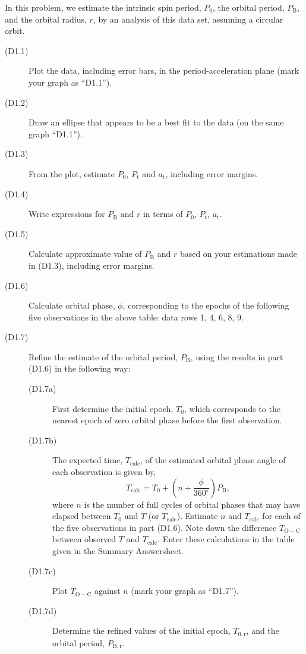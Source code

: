 In this problem, we estimate the intrinsic spin period, $P_0$, the orbital
period, $P_{\mathrm{B}}$, and the orbital radius, $r$, by an analysis of this
data set, assuming a circular orbit.

\begin{description}
\item[(D1.1)] Plot the data, including error bars, in the
  period-acceleration plane (mark your graph as ``D1.1'').
\item[(D1.2)] Draw an ellipse that appears to be a best fit to the data (on
  the same graph ``D1.1'').
\item[(D1.3)] From the plot, estimate $P_0$, $P_{\mathrm{t}}$ and
  $a_{\mathrm{t}}$, including error margins.
\item[(D1.4)] Write expressions for $P_{\mathrm{B}}$ and $r$ in terms of
  $P_0$, $P_{\mathrm{t}}$, $a_{\mathrm{t}}$.
\item[(D1.5)] Calculate approximate value of $P_{\mathrm{B}}$ and $r$ based
  on your estimations made in (D1.3), including error margins.
\item[(D1.6)] Calculate orbital phase, $\phi$, corresponding to the epochs
  of the following five observations in the above table: data rows 1, 4, 6,
  8, 9.
\item[(D1.7)] Refine the estimate of the orbital period, $P_{\mathrm{B}}$,
  using the results in part (D1.6) in the following way:
  \begin{description}
  \item[(D1.7a)] First determine the initial epoch, $T_0$, which corresponds
    to the nearest epoch of zero orbital phase before the first observation.
  \item[(D1.7b)] The expected time, $T_{\mathrm{calc}}$, of the estimated
    orbital phase angle of each observation is given by,
    \[ T_{\mathrm{calc}} = T_0
       + \left(n + \frac{\phi}{360^\circ}\right) P_{\mathrm{B}}, \]
    where $n$ is the number of full cycles of orbital phases that may have
    elapsed between $T_0$ and $T$ (or $T_{\mathrm{calc}}$). Estimate $n$ and
    $T_{\mathrm{calc}}$ for each of the five observations in part (D1.6).
    Note down the difference $T_{\mathrm{O-C}}$ between observed $T$ and
    $T_{\mathrm{calc}}$. Enter these calculations in the table given in the
    Summary Answersheet.
  \item[(D1.7c)] Plot $T_{\mathrm{O-C}}$ against $n$ (mark your graph as
    ``D1.7'').
  \item[(D1.7d)] Determine the refined values of the initial epoch,
    $T_{0,\mathrm{r}}$, and the orbital period, $P_{\mathrm{B,r}}$.
  \end{description}
\end{description}

